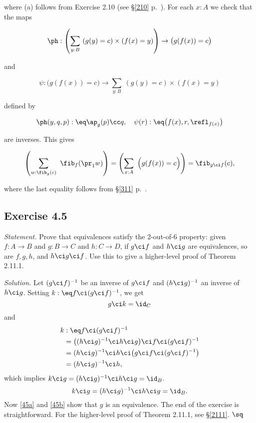 \documentclass[12pt]{article}
\begin{document}
\nn where (a) follows from Exercise 2.10 (see \S\ref{210} p.~\pageref{210}). For each $x:A$ we check that the maps 

$$\ph:\left(\sum_{y:B}\ (g(y)=c)\times(f(x)=y)\right)\to\big(g(f(x))=c\big)$$ 

\nn and 

$$\psi:\big(g(f(x))=c\big)\to\sum_{y:B}\ (g(y)=c)\times(f(x)=y)$$ 

\nn defined by 

$$\ph(y,q,p):\eq\ap_g(p)\cc q,\quad\psi(r):\eq\big(f(x),r,\refl_{f(x)}\big)$$ 

\nn are inverses. This gives 

$$\left(\sum_{w:\fib_g(c)}\ \fib_f(\pr_1w)\right)=\left(\sum_{x:A}\ \Big(g(f(x))=c\Big)\right)=\fib_{g\ci f}(c),$$

\nn where the last equality follows from \S\ref{311} p.~\pageref{311}.


\subsection{Exercise 4.5}\label{45}

\emph{Statement.} Prove that equivalences satisfy the 2-out-of-6 property: given $f:A\to B$ and $g:B\to C$ and $h:C\to D$, if $g\ci f$ and $h\ci g$ are equivalences, so are $f,g,h$, and $h\ci g\ci f$. Use this to give a higher-level proof of Theorem 2.11.1.

\nn\emph{Solution.} Let $(g\ci f)^{-1}$ be an inverse of $g\ci f$ and $(h\ci g)^{-1}$ an inverse of $h\ci g$. Setting $k:\eq f\ci(g\ci f)^{-1}$, we get 
\begin{equation}\label{45a}
g\ci k=\id_C
\end{equation}
and
\begin{align*}
k&:\eq f\ci (g\ci f)^{-1}\\
&=\big((h\ci g)^{-1}\ci h\ci g\big)\ci f\ci (g\ci f)^{-1}\\
&=(h\ci g)^{-1}\ci h\ci\big(g\ci f\ci (g\ci f)^{-1}\big)\\
&=(h\ci g)^{-1}\ci h,
\end{align*}
which implies $k\ci g=(h\ci g)^{-1}\ci h\ci g=\id_B$.
\begin{equation}\label{45b}
k\ci g=(h\ci g)^{-1}\ci h\ci g=\id_B.
\end{equation} 
Now \eqref{45a} and \eqref{45b} show that $g$ is an equivalence. The end of the exercise is straightforward. For the higher-level proof of Theorem 2.11.1, see \S\ref{2111}. $\sq$
\end{document}
